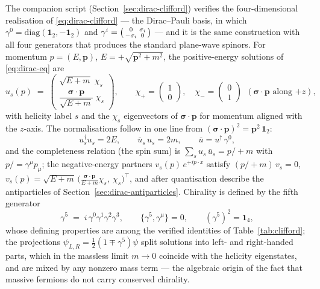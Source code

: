 The companion script (Section~\ref{sec:dirac-clifford}) verifies the
four-dimensional realisation of \eqref{eq:dirac-clifford} --- the
Dirac--Pauli basis, in which
$\gamma^{0} = \mathrm{diag}(\mathbf{1}_2, -\mathbf{1}_2)$ and
$\gamma^{i} = \begin{psmallmatrix} 0 & \sigma_i \\ -\sigma_i & 0
\end{psmallmatrix}$ --- and it is the same construction with all four
generators that produces the standard plane-wave spinors. For momentum
$p = (E, \mathbf{p})$, $E = +\sqrt{\mathbf{p}^{2}+m^{2}}$, the
positive-energy solutions of \eqref{eq:dirac-eq} are
\begin{equation}
u_s(p) \;=\;
\begin{pmatrix}
\sqrt{E+m}\; \chi_s \\[2pt]
\dfrac{\boldsymbol{\sigma}\cdot\mathbf{p}}{\sqrt{E+m}}\; \chi_s
\end{pmatrix},
\qquad
\chi_{+} = \begin{pmatrix} 1 \\ 0 \end{pmatrix},
\quad
\chi_{-} = \begin{pmatrix} 0 \\ 1 \end{pmatrix}
\ \ (\text{$\boldsymbol{\sigma}\cdot\mathbf{p}$ along $+z$}),
\label{eq:dirac-uspinor}
\end{equation}
with helicity label $s$ and the $\chi_s$ eigenvectors of
$\boldsymbol{\sigma}\cdot\mathbf{p}$ for momentum aligned with the $z$-axis.
The normalisations follow in one line from
$(\boldsymbol{\sigma}\cdot\mathbf{p})^{2} = \mathbf{p}^{2}\,\mathbf{1}_2$:
\begin{equation}
u_s^{\dagger} u_s = 2E,
\qquad
\bar{u}_s\, u_s = 2m,
\qquad
\bar{u} = u^{\dagger}\,\gamma^{0},
\label{eq:dirac-normalisation}
\end{equation}
and the completeness relation (the spin sum) is
$\sum_s u_s\,\bar{u}_s = p\!\!\!/ + m$ with
$p\!\!\!/ = \gamma^{\mu}p_{\mu}$; the negative-energy partners
$v_s(p)\,e^{+ip\cdot x}$ satisfy $(p\!\!\!/ + m)\,v_s = 0$,
$v_s(p) = \sqrt{E+m}\,
\bigl(\tfrac{\boldsymbol{\sigma}\cdot\mathbf{p}}{E+m}\chi_s,\ \chi_s
\bigr)^{\!\top}$, and after quantisation describe the antiparticles of
Section~\ref{sec:dirac-antiparticles}. Chirality is defined by the fifth
generator
\begin{equation}
\gamma^{5} \;=\; i\,\gamma^{0}\gamma^{1}\gamma^{2}\gamma^{3},
\qquad
\{\gamma^{5}, \gamma^{\mu}\} = 0,
\qquad
(\gamma^{5})^{2} = \mathbf{1}_4,
\label{eq:dirac-gamma5}
\end{equation}
whose defining properties are among the verified identities of
Table~\ref{tab:clifford}; the projections
$\psi_{L,R} = \tfrac{1}{2}(1 \mp \gamma^{5})\psi$ split solutions into
left- and right-handed parts, which in the massless limit $m \to 0$
coincide with the helicity eigenstates, and are mixed by any nonzero mass
term --- the algebraic origin of the fact that massive fermions do not
carry conserved chirality.


